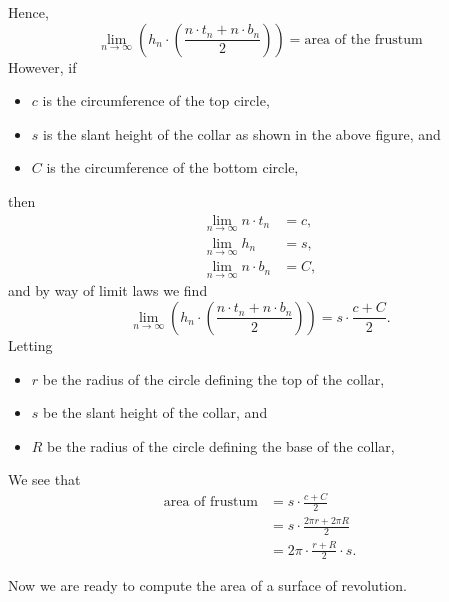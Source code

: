 \documentclass{ximera}
\begin{document}
\begin{theorem}
\begin{explanation}
\begin{image}
    \end{image}
    Hence,
    \[
    \lim_{n\to \infty} \left(h_n\cdot \left(\frac{n\cdot t_{n}+n\cdot b_n}{2}\right)\right) = \text{area of the frustum}
    \]
    However, if
    \begin{itemize}
    \item $c$ is the circumference of the top circle,
    \item $s$ is the slant height of the collar as shown in the above
      figure, and 
    \item $C$ is the circumference of the bottom circle,    
    \end{itemize}
    then
    \begin{align*}
      \lim_{n\to \infty} n \cdot t_{n}  &  =c,\\
      \lim_{n\to \infty} h_{n}  &  =s,\\
      \lim_{n\to \infty} n\cdot b_{n}  &  =C,
    \end{align*}
    and by way of limit laws we find
    \[
    \lim_{n\to \infty} \left(h_n\cdot \left(\frac{n\cdot t_{n}+n\cdot b_n}{2}\right)\right) = s\cdot \frac{c + C}{2}.
    \]
    Letting
    \begin{itemize}
    \item $r$ be the radius of the circle defining the top of the collar,
    \item $s$ be the slant height of the collar, and
    \item $R$ be the radius of the circle defining the base of the collar,
    \end{itemize}
    We see that 
    \begin{align*}
      \text{area of frustum}  &= s\cdot \frac{c + C}{2} \\
      &= s\cdot \frac{2\pi r + 2\pi R}{2}\\
      &=2\pi \cdot \frac{r+R}{2}\cdot s.
    \end{align*}
  \end{explanation}
\end{theorem}
Now we are ready to compute the area of a surface of revolution.
\end{document}
